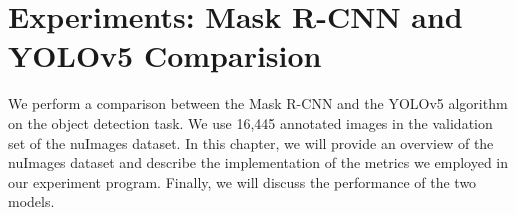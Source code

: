 \chapter{Experiments: Mask R-CNN and YOLOv5 Comparision} \label{chap:experiments}

We perform a comparison between the Mask R-CNN and the YOLOv5 algorithm on the object detection task. We use 16,445 annotated images in the validation set of the nuImages dataset. In this chapter, we will provide an overview of the nuImages dataset and describe the implementation of the metrics we employed in our experiment program. Finally, we will discuss the performance of the two models.








